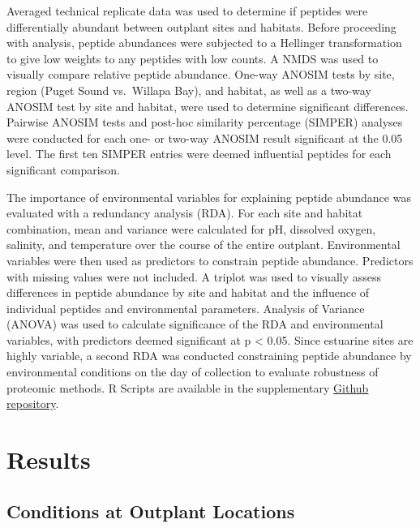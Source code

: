 \documentclass [11pt, proquest] {uwthesis}[2015/03/03]
\begin{document}
Averaged technical replicate data was used to determine if peptides were differentially abundant between outplant sites and habitats. Before proceeding with analysis, peptide abundances were subjected to a Hellinger transformation to give low weights to any peptides with low counts. A NMDS was used to visually compare relative peptide abundance. One-way ANOSIM tests by site, region (Puget Sound vs.~Willapa Bay), and habitat, as well as a two-way ANOSIM test by site and habitat, were used to determine significant differences. Pairwise ANOSIM tests and post-hoc similarity percentage (SIMPER) analyses were conducted for each one- or two-way ANOSIM result significant at the 0.05 level. The first ten SIMPER entries were deemed influential peptides for each significant comparison.

The importance of environmental variables for explaining peptide abundance was evaluated with a redundancy analysis (RDA). For each site and habitat combination, mean and variance were calculated for pH, dissolved oxygen, salinity, and temperature over the course of the entire outplant. Environmental variables were then used as predictors to constrain peptide abundance. Predictors with missing values were not included. A triplot was used to visually assess differences in peptide abundance by site and habitat and the influence of individual peptides and environmental parameters. Analysis of Variance (ANOVA) was used to calculate significance of the RDA and environmental variables, with predictors deemed significant at p \textless{} 0.05. Since estuarine sites are highly variable, a second RDA was conducted constraining peptide abundance by environmental conditions on the day of collection to evaluate robustness of proteomic methods. R Scripts are available in the supplementary \href{https://github.com/RobertsLab/paper-gigas-DNR-proteomics}{Github repository}.

\hypertarget{results}{%
\section{Results}\label{results}}

\hypertarget{conditions-at-outplant-locations}{%
\subsection{Conditions at Outplant Locations}\label{conditions-at-outplant-locations}}
\end{document}
